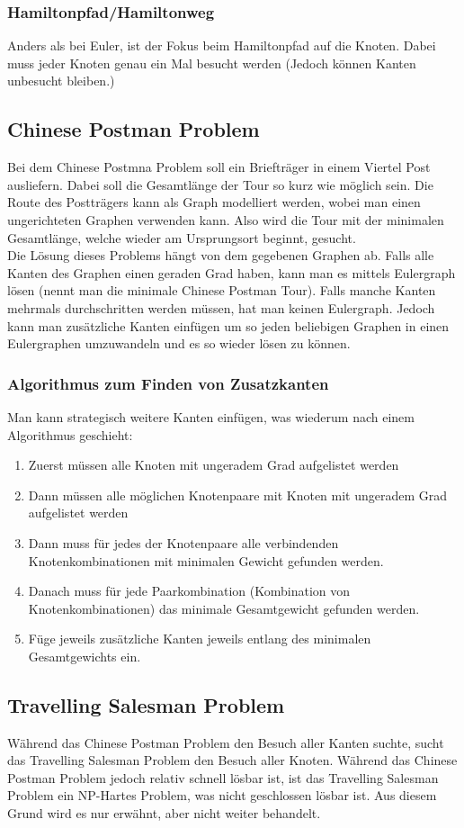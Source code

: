 \documentclass{article}
\begin{document}
	\subsubsection{Hamiltonpfad/Hamiltonweg}
	Anders als bei Euler, ist der Fokus beim Hamiltonpfad auf die Knoten. Dabei muss jeder Knoten genau ein Mal besucht werden (Jedoch können Kanten unbesucht bleiben.)
	\subsection{Chinese Postman Problem}
	Bei dem Chinese Postmna Problem soll ein Briefträger in einem Viertel Post ausliefern. Dabei soll die Gesamtlänge der Tour so kurz wie möglich sein. Die Route des Postträgers kann als Graph modelliert werden, wobei man einen ungerichteten Graphen verwenden kann. Also wird die Tour mit der minimalen Gesamtlänge, welche wieder am Ursprungsort beginnt, gesucht. \\
	Die Lösung dieses Problems hängt von dem gegebenen Graphen ab. Falls alle Kanten des Graphen einen geraden Grad haben, kann man es mittels Eulergraph lösen (nennt man die minimale Chinese Postman Tour). Falls manche Kanten mehrmals durchschritten werden müssen, hat man keinen Eulergraph. Jedoch kann man zusätzliche Kanten einfügen um so jeden beliebigen Graphen in einen Eulergraphen umzuwandeln und es so wieder lösen zu können.
	\subsubsection{Algorithmus zum Finden von Zusatzkanten}
	Man kann strategisch weitere Kanten einfügen, was wiederum nach einem Algorithmus geschieht:
	\begin{enumerate}
		\item{Zuerst müssen alle Knoten mit ungeradem Grad aufgelistet werden}
		\item{Dann müssen alle möglichen Knotenpaare mit Knoten mit ungeradem Grad aufgelistet werden}
		\item{Dann muss für jedes der Knotenpaare alle verbindenden Knotenkombinationen mit minimalen Gewicht gefunden werden.}
		\item{Danach muss für jede Paarkombination (Kombination von Knotenkombinationen) das minimale Gesamtgewicht gefunden werden.}
		\item{Füge jeweils zusätzliche Kanten jeweils entlang des minimalen Gesamtgewichts ein.}
	\end{enumerate}
	\subsection{Travelling Salesman Problem}
	Während das Chinese Postman Problem den Besuch aller Kanten suchte, sucht das Travelling Salesman Problem den Besuch aller Knoten. Während das Chinese Postman Problem jedoch relativ schnell lösbar ist, ist das Travelling Salesman Problem ein NP-Hartes Problem, was nicht geschlossen lösbar ist. Aus diesem Grund wird es nur erwähnt, aber nicht weiter behandelt.

	























  
\end{document}
